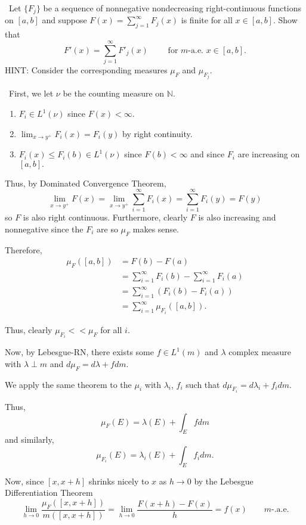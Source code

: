 \documentclass[12pt]{Homework}
\begin{document}
\begin{problem} $\,$
Let $\{F_j\}$ be a sequence of nonnegative nondecreasing right-continuous functions on $[a,b]$ and suppose $F(x)=\sum_{j=1}^\infty F_j(x)$ is finite for all $x\in[a,b]$. Show that $$F'(x)=\sum_{j=1}^\infty F'_j(x)\qquad\text{ for }m\text{-a.e. }x\in[a,b].$$ HINT: Consider the corresponding measures $\mu_F$ and $\mu_{F_j}$.
\end{problem}


\begin{solution}$\,$
First, we let $\nu$ be the counting measure on $\mathbb{N}$.
\begin{enumerate}
    \item $F_i\in L^1(\nu)$ since $F(x)<\infty.$
    \item $\displaystyle \lim_{x\to y^+}F_i(x)=F_i(y)$ by right continuity.
    \item $F_i(x)\le F_i(b)\in L^1(\nu)$ since $F(b)<\infty$ and since $F_i$ are increasing on $[a,b].$
\end{enumerate}

Thus, by Dominated Convergence Theorem, $$\lim_{x\to y^+}F(x)=\lim_{x\to y^+}\sum_{i=1}^\infty F_i(x)=\sum_{i=1}^\infty F_i(y)=F(y)$$ so $F$ is also right continuous. Furthermore, clearly $F$ is also increasing and nonnegative since the $F_i$ are so $\mu_F$ makes sense.

Therefore, \begin{align*}
    \mu_F([a,b])&=F(b)-F(a)\\
    &=\sum_{i=1}^\infty F_i(b)-\sum_{i=1}^\infty F_i(a)\\
    &=\sum_{i=1}^\infty(F_i(b)-F_i(a))\\
    &=\sum_{i=1}^\infty\mu_{F_i}([a,b]).
\end{align*}

Thus, clearly $\mu_{F_i}<<\mu_F$ for all $i$.

Now, by Lebesgue-RN, there exists some $f\in L^1(m)$ and $\lambda$ complex measure with $\lambda\perp m$ and $d\mu_F=d\lambda+fdm.$

We apply the same theorem to the $\mu_i$ with $\lambda_i$, $f_i$ such that $d\mu_{F_i}=d\lambda_i +f_idm$.

Thus, $$\mu_F(E)=\lambda(E)+\int_Efdm$$ and similarly, $$\mu_{F_i}(E)=\lambda_i(E)+\int_Ef_idm.$$

Now, since $[x,x+h]$ shrinks nicely to $x$ as $h\to0$ by the Lebesgue Differentiation Theorem $$\lim_{h\to0}\frac{\mu_F([x,x+h])}{m([x,x+h])}=\lim_{h\to0}\frac{F(x+h)-F(x)}{h}=f(x)\qquad m\text{-.a.e}.$$


\end{solution}
\end{document}
